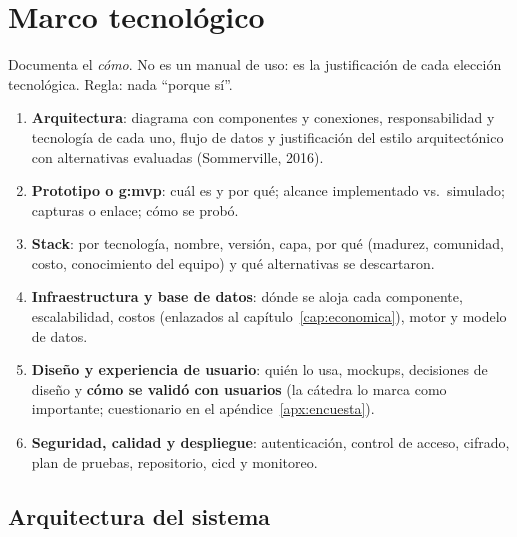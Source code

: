 
\chapter{Marco tecnológico}\label{cap:marco-tecnologico}

\begin{guia}
Documenta el \emph{cómo}. No es un manual de uso: es la justificación
de cada elección tecnológica. Regla: nada ``porque sí''.
\begin{enumerate}
    \item \textbf{Arquitectura}: diagrama con componentes y conexiones,
          responsabilidad y tecnología de cada uno, flujo de datos y
          justificación del estilo arquitectónico con alternativas
          evaluadas (Sommerville, 2016).
    \item \textbf{Prototipo o \gls{g:mvp}}: cuál es y por qué; alcance
          implementado vs.\ simulado; capturas o enlace; cómo se probó.
    \item \textbf{Stack}: por tecnología, nombre, versión, capa, por qué
          (madurez, comunidad, costo, conocimiento del equipo) y qué
          alternativas se descartaron.
    \item \textbf{Infraestructura y base de datos}: dónde se aloja cada
          componente, escalabilidad, costos (enlazados al
          capítulo~\ref{cap:economica}), motor y modelo de datos.
    \item \textbf{Diseño y experiencia de usuario}: quién lo usa, mockups, decisiones de
          diseño y \textbf{cómo se validó con usuarios} (la cátedra lo marca
          como importante; cuestionario en el apéndice~\ref{apx:encuesta}).
    \item \textbf{Seguridad, calidad y despliegue}: autenticación, control
          de acceso, cifrado, plan de pruebas, repositorio, \gls{cicd} y
          monitoreo.
\end{enumerate}
\end{guia}

\section{Arquitectura del sistema}\label{sec:n4.1}

